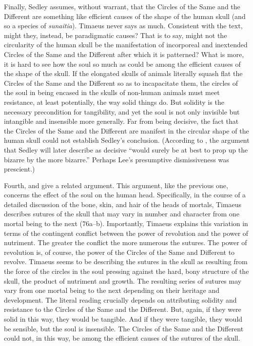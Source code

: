 Finally, Sedley assumes, without warrant, that the Circles of the Same and the Different are something like efficient causes of the shape of the human skull (and so a species of \emph{sunaitia}). Timaeus never says as much. Consistent with the text, might they, instead, be paradigmatic causes? That is to say, might not the circularity of the human skull be the manifestation of incorporeal and inextended Circles of the Same and the Different after which it is patterned? What is more, it is hard to see how the soul so much as could be among the efficient causes of the shape of the skull. If the elongated skulls of animals literally squash flat the Circles of the Same and the Different so as to incapacitate them, the circles of the soul in being encased in the skulls of non-human animals must meet resistance, at least potentially, the way solid things do. But solidity is the necessary precondition for tangibility, and yet the soul is not only invisible but intangible and insensible more generally. Far from being decisive, the fact that the Circles of the Same and the Different are manifest in the circular shape of the human skull could not establish Sedley's conclusion. (According to \citealt[72]{Lee:1976xs}, the argument that Sedley will later describe as decisive ``would surely be at best to prop up the bizarre by the more bizarre.'' Perhaps Lee's presumptive dismissiveness was prescient.)

Fourth, \citet[330]{Sedley:1997kr} and \citet[132]{Betegh:2019fq} give a related argument. This argument, like the previous one, concerns the effect of the soul on the human head. Specifically, in the course of a detailed discussion of the bone, skin, and hair of the heads of mortals, Timaeus describes sutures of the skull that may vary in number and character from one mortal being to the next (76a--b). Importantly, Timaeus explains this variation in terms of the contingent conflict between the power of revolution and the power of nutriment. The greater the conflict the more numerous the sutures. The power of revolution is, of course, the power of the Circles of the Same and Different to revolve. Timaeus seems to be describing the sutures in the skull as resulting from the force of the circles in the soul pressing against the hard, bony structure of the skull, the product of nutriment and growth. The resulting series of sutures may vary from one mortal being to the next depending on their heritage and development. The literal reading crucially depends on attributing solidity and resistance to the Circles of the Same and the Different. But, again, if they were solid in this way, they would be tangible. And if they were tangible, they would be sensible, but the soul is insensible. The Circles of the Same and the Different could not, in this way, be among the efficient causes of the sutures of the skull.

